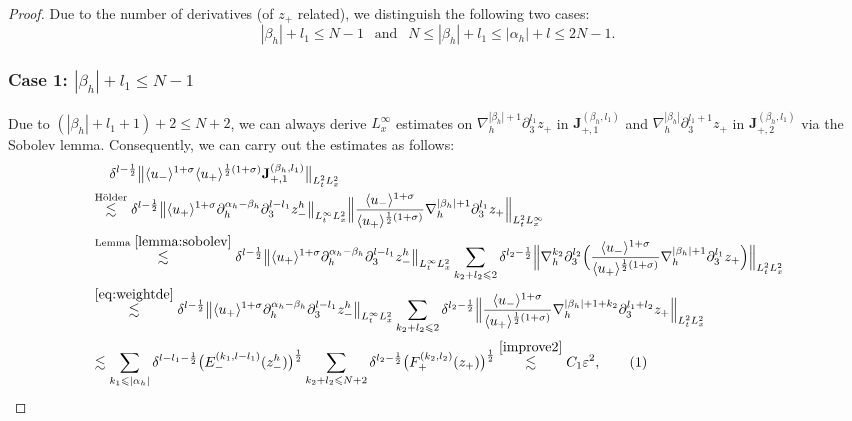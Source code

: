 \documentclass[10pt,reqno]{amsart}
\numberwithin{equation}{section}
\begin{document}
\begin{proof}
Due to the number of derivatives (of $z_+$ related), we distinguish the following two cases:	
	\[|\beta_h|+l_1\leqslant N-1\ \ \text{ and }\ \ N\leqslant|\beta_h|+l_1\leqslant |\alpha_h|+l\leqslant 2N-1.\]
	\subsubsection*{\bf Case 1:  $|\beta_h|+l_1\leqslant N-1$} 
	Due to $(|\beta_h|+l_1+1)+2\leqslant N+2$, we can always derive $L^\infty_x$ estimates on $\nabla_h^{|\beta_h|+1}\partial_3^{l_1} z_{+}$ in $\mathbf{J}_{+,1}^{(\beta_h,l_1)}$ and $\nabla_h^{|\beta_h|}\partial_3^{l_1+1} z_{+}$ in $\mathbf{J}_{+,2}^{(\beta_h,l_1)}$ via the Sobolev lemma. Consequently, we can  carry out the estimates as follows:
	\begin{align*}
		&\ \ \ \ \delta^{l-\frac{1}{2}}\big\|\langle u_-\rangle^{1+\sigma}\langle u_+\rangle^{\frac{1}{2}(1+\sigma)}\mathbf{J}_{+,1}^{(\beta_h,l_1)}\big\|_{L^2_tL^2_x}\\
		&\stackrel{\text{H\"older}}{\lesssim}\delta^{l-\frac{1}{2}}\big\|\langle u_+\rangle^{1+\sigma}\partial_h^{\alpha_h-\beta_h}\partial_3^{l-l_1}z_-^h\big\|_{L^\infty_tL^2_x}\Big\|\frac{\langle u_-\rangle^{1+\sigma}}{\langle u_+\rangle^{\frac{1}{2}(1+\sigma)}}\nabla_h^{|\beta_h|+1}\partial_3^{l_1} z_{+}\Big\|_{L^2_tL^\infty_x}\\
		& \stackrel{\text{Lemma } \ref{lemma:sobolev}}{\lesssim}\delta^{l-\frac{1}{2}}\big\|\langle u_+\rangle^{1+\sigma}\partial_h^{\alpha_h-\beta_h}\partial_3^{l-l_1}z_-^h\big\|_{L^\infty_tL^2_x} \sum_{k_2+l_2\leqslant 2}\delta^{l_2-\frac{1}{2}}\Big\|\nabla_h^{k_2}\partial_3^{l_2}\Big(\frac{\langle u_-\rangle^{1+\sigma}}{\langle u_+\rangle^{\frac{1}{2}(1+\sigma)}}\nabla_h^{|\beta_h|+1}\partial_3^{l_1} z_{+}\Big)\Big\|_{L^2_tL^2_x}\\
		&\stackrel{\eqref{eq:weightde}}{\lesssim}\delta^{l-\frac{1}{2}}\big\|\langle u_+\rangle^{1+\sigma}\partial_h^{\alpha_h-\beta_h}\partial_3^{l-l_1}z_-^h\big\|_{L^\infty_tL^2_x}\sum_{k_2+l_2\leqslant 2}\delta^{l_2-\frac{1}{2}}\Big\|\frac{\langle u_-\rangle^{1+\sigma}}{\langle u_+\rangle^{\frac{1}{2}(1+\sigma)}}\nabla_h^{|\beta_h|+1+k_2}\partial_3^{l_1+l_2} z_{+}\Big\|_{L^2_tL^2_x}\\
		&\lesssim\sum_{k_1\leqslant|\alpha_h|}\delta^{l-l_1-\frac{1}{2}} \big(E_-^{(k_1,l-l_1)}(z_-^h)\big)^{\frac{1}{2}}\sum_{k_2+l_2\leqslant N+ 2}\delta^{l_2-\frac{1}{2}}\big(F_+^{(k_2,l_2)}(z_+)\big)^{\frac{1}{2}}
		\stackrel{\eqref{improve2}}{\lesssim} C_1\varepsilon^2,\stepcounter{equation}\tag{\theequation}\label{eqA1}\\

\end{align*}
\end{proof}
\end{document}
